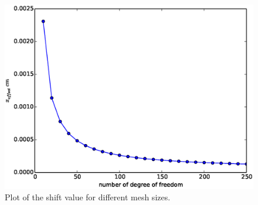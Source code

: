 \documentclass[times,doublespace]{fldauth}%
\begin{document}
%
\begin{figure}[H]
    \centering
    \includegraphics[width=\textwidth]{figures/cst-xs/mach-1p05-x-offset.eps}
    \caption{Plot of the shift value for different mesh sizes.}\label{fig:mach-1p05-x-offset}
\end{figure}
%
\end{document}
